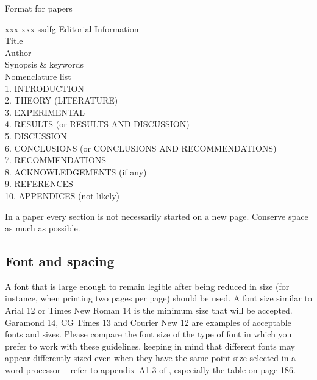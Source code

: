 \documentclass[a5paper, 10pt]{article}
\begin{document}
\begin{table}[htbp]
\centering
\caption{Format for papers}
\label{tab:paperformat}

\begin{boxedminipage}[t]{0.7\textwidth}
  \begin{spacing}{1.8}
    \begin{tabbing}
      xxx \= xxx \= ssdfg \kill
      Editorial Information                                    \\
          \> Title                                             \\
          \> Author                                            \\         
          \> Synopsis \& keywords                              \\
          \> Nomenclature list                                 \\
      1.  \> INTRODUCTION                                      \\
      2.  \> THEORY  (LITERATURE)                              \\
      3.  \> EXPERIMENTAL                                      \\
      4.  \> RESULTS  (or RESULTS AND DISCUSSION)              \\
      5.  \> DISCUSSION                                        \\
      6.  \> CONCLUSIONS  (or CONCLUSIONS AND RECOMMENDATIONS) \\
      7.  \> RECOMMENDATIONS                                   \\
      8.  \> ACKNOWLEDGEMENTS  (if any)                        \\
      9.  \> REFERENCES                                        \\
      10. \> APPENDICES  (not likely)
    \end{tabbing}
  \end{spacing}
\end{boxedminipage}

In a paper every section is not necessarily started on a new page.
Conserve space as much as possible.
\end{table}

\subsection{Font and spacing}
A font that is large enough to remain legible after being reduced in
size (for instance, when printing two pages per page) should be used.
A font size similar to Arial 12 or Times New Roman 14 is the minimum
size that will be accepted.  Garamond 14, CG Times 13 and Courier New
12 are examples of acceptable fonts and sizes.  Please compare the
font size of the type of font in which you prefer to work with these
guidelines, keeping in mind that different fonts may appear
differently sized even when they have the same point size selected in
a word processor -- refer to appendix~A1.3 of
\citet{bruckmanmandersloot}, especially the table on page 186.
\end{document}
